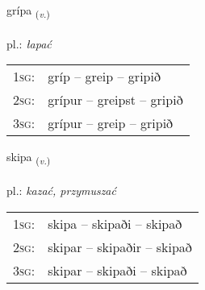 \documentclass[frontgrid, backgrid]{flacards}\usepackage[]{graphicx}\usepackage[]{xcolor}
\begin{document}
\renewcommand{\flhead}{\vskip5pt \fboxsep=0pt {\small\bfseries\footnotesize Sagnorð | Verb}}
\renewcommand{\fcfoot}{\vskip5pt \fboxsep=0pt \hspace{2pt}{\small\bfseries\footnotesize 1K}}

\renewcommand{\blhead}{\vskip5pt {\small\bfseries\footnotesize Sagnorð | Verb }}
\renewcommand{\bcfoot}{\vskip5pt \hspace{2pt}{\small\bfseries\footnotesize 1K}}


{grípa \small{\textsubscript{(\textit{v.})}} \\[1ex] %
\textphonetic{[kriːpa]} \\
pl.: \emph{łapać} \\  [2ex]
\renewcommand*{\arraystretch}{0.8}
\begin{tabular}{p{1cm}l}
\textsc{1sg}: & gríp -- greip -- gripið \\ 
\textsc{2sg}: & grípur -- greipst -- gripið \\ 
\textsc{3sg}: & grípur -- greip -- gripið \\ 
\end{tabular}
}

\renewcommand{\flhead}{\vskip5pt \fboxsep=0pt {\small\bfseries\footnotesize Sagnorð | Verb}}
\renewcommand{\fcfoot}{\vskip5pt \fboxsep=0pt \hspace{2pt}{\small\bfseries\footnotesize 1K}}

\renewcommand{\blhead}{\vskip5pt {\small\bfseries\footnotesize Sagnorð | Verb }}
\renewcommand{\bcfoot}{\vskip5pt \hspace{2pt}{\small\bfseries\footnotesize 1K}}


{skipa \small{\textsubscript{(\textit{v.})}} \\[1ex] %
\textphonetic{[scɪːpa]} \\
pl.: \emph{kazać, przymuszać} \\  [2ex]
\renewcommand*{\arraystretch}{0.8}
\begin{tabular}{p{1cm}l}
\textsc{1sg}: & skipa -- skipaði -- skipað \\ 
\textsc{2sg}: & skipar -- skipaðir -- skipað \\ 
\textsc{3sg}: & skipar -- skipaði -- skipað \\ 
\end{tabular}
}
\end{document}
